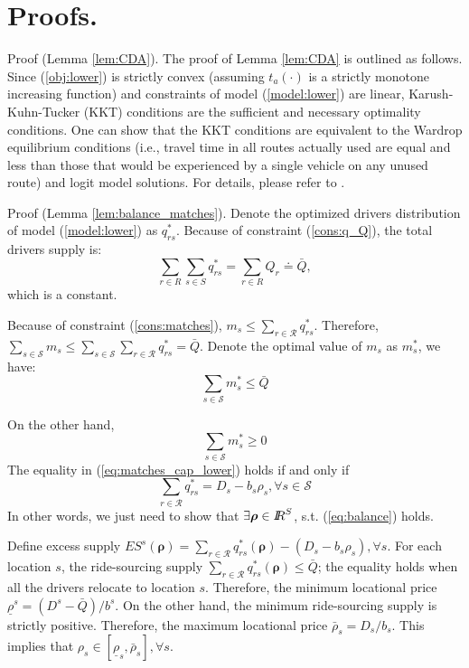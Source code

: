 \section{Proofs.}\label{app:pfs}

\state Proof (Lemma \ref{lem:CDA}).
The proof of Lemma \ref{lem:CDA} is outlined as follows. Since (\ref{obj:lower}) is strictly convex (assuming $t_a(\cdot)$ is a strictly monotone increasing function) and constraints of model (\ref{model:lower}) are linear, Karush-Kuhn-Tucker (KKT) conditions are the sufficient and necessary optimality conditions. One can show that the KKT conditions are equivalent to the Wardrop equilibrium conditions (i.e., travel time in all routes actually used are equal and less than those that would be experienced by a single vehicle on any unused route) and logit model solutions. For details, please refer to \citep{evans1976derivation}.
\eop

\state Proof (Lemma \ref{lem:balance_matches}).
Denote the optimized drivers distribution of model (\ref{model:lower}) as $q_{rs}^{\ast}$. Because of constraint (\ref{cons:q_Q}), the total drivers supply is:
\[\sum_{r\in R}\sum_{s \in S}q_{rs}^{\ast} = \sum_{r\in R}Q_{r} \doteq \bar{Q},\] which is a constant.

Because of constraint (\ref{cons:matches}), $ m_s \leq \sum_{r \in \mathcal{R}} q_{rs}^{\ast}$. Therefore, $\sum_{s \in \mathcal{S}} m_s \leq \sum_{s \in \mathcal{S}}\sum_{r \in \mathcal{R}} q_{rs}^{\ast} = \bar{Q}$.  Denote the optimal value of $m_s$ as $m^{\ast}_s$, we have: 
\begin{equation}
    \sum_{s \in \mathcal{S}}m^{\ast}_s \leq \bar{Q}\label{eq:matches_cap}
\end{equation}

On the other hand, 
\begin{equation}
    \sum_{s \in \mathcal{S}}m^{\ast}_s \geq 0\label{eq:matches_cap_lower}
\end{equation}
The equality in (\ref{eq:matches_cap_lower}) holds if and only if 
\begin{equation}
    \sum_{r\in \mathcal{R}}q_{rs}^{\ast} = D_s - b_s\rho_s, \forall s \in \mathcal{S}\label{eq:balance}
\end{equation}
In other words, we just need to show that $\exists \bm{\rho} \in {I\kern-.35em R}^{S}$, s.t. (\ref{eq:balance}) holds.

Define excess supply $ES^s (\bm{\rho}) = \sum_{r \in \mathcal{R}}q_{rs}^{\ast} (\bm{\rho}) - (D_s - b_s \rho_s), \forall s$. For each location $s$, the ride-sourcing supply $\sum_{r \in \mathcal{R}}q_{rs}^{\ast} (\bm{\rho}) \leq \bar{Q}$; the equality holds when all the drivers relocate to location $s$. Therefore, the minimum locational price $\underline{\rho}^s = (D^s-\bar{Q})/b^s$. On the other hand, the minimum ride-sourcing supply is strictly positive. Therefore, the maximum locational price $\bar{\rho}_s = D_s/b_s$. This implies that $\rho_s \in [\underline{\rho}_s, \bar{\rho}_s], \forall s$.

